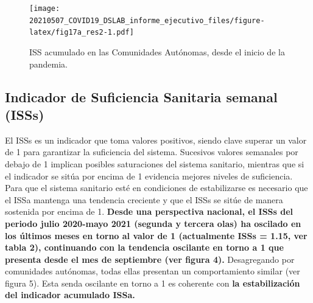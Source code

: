 \documentclass[
  11pt,
]{article}
\begin{document}
\vspace{0.2cm}

\begin{figure}
\centering
\texttt{[image: 20210507\_COVID19\_DSLAB\_informe\_ejecutivo\_files/figure-latex/fig17a\_res2-1.pdf]}
\caption{\label{fig:fig17a_res} ISS acumulado en las Comunidades
Autónomas, desde el inicio de la pandemia.}
\end{figure}

\newpage
\setcounter{page}{6}

\hypertarget{indicador-de-suficiencia-sanitaria-semanal-isss}{%
\subsection{Indicador de Suficiencia Sanitaria semanal
(ISSs)}\label{indicador-de-suficiencia-sanitaria-semanal-isss}}

El ISSs es un indicador que toma valores positivos, siendo clave superar
un valor de 1 para garantizar la suficiencia del sistema. Sucesivos
valores semanales por debajo de 1 implican posibles saturaciones del
sistema sanitario, mientras que si el indicador se sitúa por encima de 1
evidencia mejores niveles de suficiencia. Para que el sistema sanitario
esté en condiciones de estabilizarse es necesario que el ISSa mantenga
una tendencia creciente y que el ISSs se sitúe de manera sostenida por
encima de 1. \textbf{Desde una perspectiva nacional, el ISSs del periodo
julio 2020-mayo 2021 (segunda y tercera olas) ha oscilado en los últimos
meses en torno al valor de 1 (actualmente ISSs = 1.15, ver tabla 2),
continuando con la tendencia oscilante en torno a 1 que presenta desde
el mes de septiembre (ver figura 4).} Desagregando por comunidades
autónomas, todas ellas presentan un comportamiento similar (ver figura
5). Esta senda oscilante en torno a 1 es coherente con \textbf{la
estabilización del indicador acumulado ISSa.}
\end{document}
